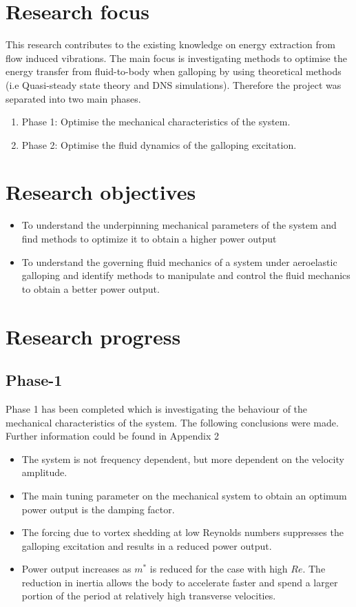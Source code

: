 \documentclass{article}
\begin{document}
\section{Research focus}
 This research contributes to the existing knowledge on energy extraction from flow induced vibrations. The main focus is investigating methods to optimise the energy transfer from fluid-to-body when galloping by using theoretical methods (i.e Quasi-steady state theory and DNS simulations). Therefore the project was separated into two main phases.
 
\begin{enumerate}[]
\item Phase 1: Optimise the mechanical characteristics of the system.
\item Phase 2: Optimise the fluid dynamics of the galloping excitation.
\end{enumerate}

\section{Research objectives}

\begin{itemize}
\item To understand the underpinning mechanical parameters of the system and find methods to optimize it to obtain a higher power output 
\item To understand the governing fluid mechanics of a system under aeroelastic galloping and identify methods to manipulate and control the fluid mechanics to obtain a better power output.  
\end{itemize}

\section{Research progress}

\subsection{Phase-1}

Phase 1 has been completed which is investigating the behaviour of the mechanical characteristics of the system. The following conclusions were made. Further information could be found in Appendix 2

\begin{itemize}
\item   The system is not frequency dependent, but more dependent on the velocity amplitude.
\item The main tuning parameter on the mechanical system to obtain an optimum power output is the damping factor.
\item The forcing due to vortex shedding at low Reynolds numbers suppresses the galloping excitation and results in a reduced power output.
\item Power output increases as $m^*$ is reduced for the case with high $Re$. The reduction in inertia allows the body to accelerate faster and spend a larger portion of the period at relatively high transverse velocities.
\end{itemize}
\end{document}
